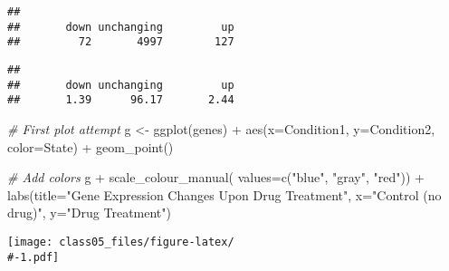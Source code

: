 \documentclass[
]{article}
\newenvironment{Shaded}{\begin{snugshade}}{\end{snugshade}}
\newcommand{\AttributeTok}[1]{\textcolor[rgb]{0.77,0.63,0.00}{#1}}
\newcommand{\CommentTok}[1]{\textcolor[rgb]{0.56,0.35,0.01}{\textit{#1}}}
\newcommand{\DecValTok}[1]{\textcolor[rgb]{0.00,0.00,0.81}{#1}}
\newcommand{\FunctionTok}[1]{\textcolor[rgb]{0.00,0.00,0.00}{#1}}
\newcommand{\NormalTok}[1]{#1}
\newcommand{\OtherTok}[1]{\textcolor[rgb]{0.56,0.35,0.01}{#1}}
\newcommand{\SpecialCharTok}[1]{\textcolor[rgb]{0.00,0.00,0.00}{#1}}
\newcommand{\StringTok}[1]{\textcolor[rgb]{0.31,0.60,0.02}{#1}}
\begin{document}
\begin{Shaded}
\end{Shaded}

\begin{verbatim}
## 
##       down unchanging         up 
##         72       4997        127
\end{verbatim}

\begin{Shaded}
\end{Shaded}

\begin{verbatim}
## 
##       down unchanging         up 
##       1.39      96.17       2.44
\end{verbatim}

\begin{Shaded}
\begin{Highlighting}[]
\CommentTok{\# First plot attempt}
\NormalTok{g }\OtherTok{\textless{}{-}} \FunctionTok{ggplot}\NormalTok{(genes) }\SpecialCharTok{+} 
  \FunctionTok{aes}\NormalTok{(}\AttributeTok{x=}\NormalTok{Condition1, }\AttributeTok{y=}\NormalTok{Condition2, }\AttributeTok{color=}\NormalTok{State) }\SpecialCharTok{+}
  \FunctionTok{geom\_point}\NormalTok{()}

\CommentTok{\# Add colors}
\NormalTok{g }\SpecialCharTok{+} \FunctionTok{scale\_colour\_manual}\NormalTok{( }\AttributeTok{values=}\FunctionTok{c}\NormalTok{(}\StringTok{"blue"}\NormalTok{, }\StringTok{"gray"}\NormalTok{, }\StringTok{"red"}\NormalTok{)) }\SpecialCharTok{+}
  \FunctionTok{labs}\NormalTok{(}\AttributeTok{title=}\StringTok{"Gene Expression Changes Upon Drug Treatment"}\NormalTok{, }
       \AttributeTok{x=}\StringTok{"Control (no drug)"}\NormalTok{, }
       \AttributeTok{y=}\StringTok{"Drug Treatment"}\NormalTok{)}
\end{Highlighting}
\end{Shaded}

\texttt{[image: class05\_files/figure-latex/\\\#-1.pdf]}
\end{document}

